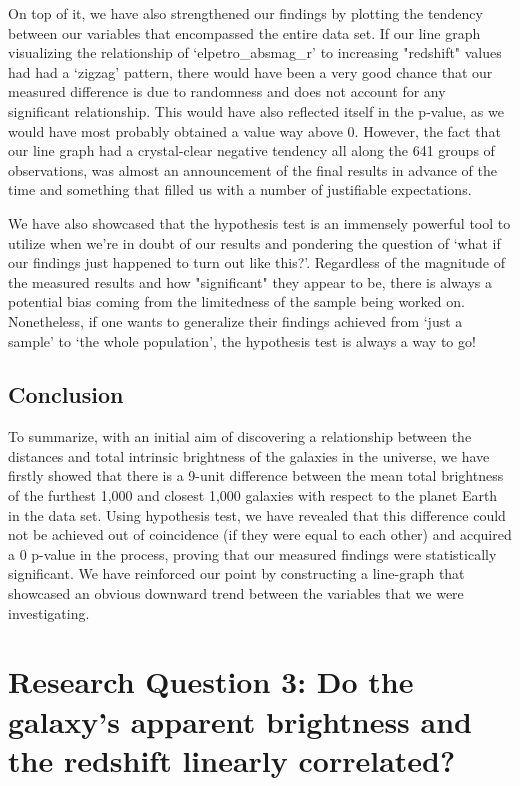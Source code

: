 \documentclass[12pt]{article}
\begin{document}
\noindent
On top of it, we have also strengthened our findings by plotting the tendency between our variables that encompassed the entire data set. If our line graph visualizing the relationship of `elpetro\_absmag\_r' to increasing "redshift" values had had a `zigzag' pattern, there would have been a very good chance that our measured difference is due to randomness and does not account for any significant relationship. This would have also reflected itself in the p-value, as we would have most probably obtained a value way above 0. However, the fact that our line graph had a crystal-clear negative tendency all along the 641 groups of observations, was almost an announcement of the final results in advance of the time and something that filled us with a number of justifiable expectations.

\noindent
We have also showcased that the hypothesis test is an immensely powerful tool to utilize when we're in doubt of our results and pondering the question of `what if our findings just happened to turn out like this?'. Regardless of the magnitude of the measured results and how "significant" they appear to be, there is always a potential bias coming from the limitedness of the sample being worked on. Nonetheless, if one wants to generalize their findings achieved from `just a sample' to `the whole population', the hypothesis test is always a way to go!


\subsection{Conclusion}

To summarize, with an initial aim of discovering a relationship between the distances and total intrinsic brightness of the galaxies in the universe, we have firstly showed that there is a 9-unit difference between the mean total brightness of the furthest 1,000 and closest 1,000 galaxies with respect to the planet Earth in the data set. Using hypothesis test, we have revealed that this difference could not be achieved out of coincidence (if they were equal to each other) and acquired a 0 p-value in the process, proving that our measured findings were statistically significant. We have reinforced our point by constructing a line-graph that showcased an obvious downward trend between the variables that we were investigating.

\newpage

\section{Research Question 3: Do the galaxy's apparent brightness and the redshift linearly correlated?}
\end{document}
